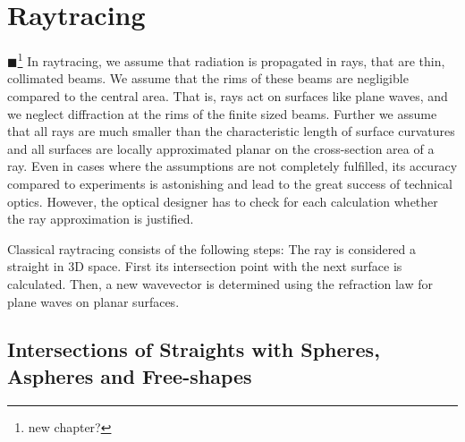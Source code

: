 \documentclass[12pt,a4paper,twoside,openright,BCOR10mm,headsepline,titlepage,abstracton,chapterprefix,final]{scrreprt}
\newcommand{\remark}[1]{{\color{red}$\blacksquare$}\footnote{{\color{red}#1}}}
\begin{document}
\chapter{Raytracing}
\remark{new chapter?}
In raytracing, we assume that radiation is propagated in rays, that are thin, collimated beams. 
We assume that the rims of these beams are negligible compared to the central area. That is, rays act on surfaces like plane waves, and we neglect diffraction at the rims of the finite sized beams.
Further we assume that all rays are much smaller than the characteristic length of surface curvatures and all surfaces are locally approximated planar on the cross-section area of a ray.
Even in cases where the assumptions are not completely fulfilled, its accuracy compared to experiments is astonishing and lead to the great success of technical optics.
However, the optical designer has to check for each calculation whether the ray approximation is justified.

Classical raytracing consists of the following steps: The ray is considered a straight in 3D space. First its intersection point with the next surface is calculated. 
Then, a new wavevector is determined using the refraction law for plane waves on planar surfaces.

\section{Intersections of Straights with Spheres, Aspheres and Free-shapes}\label{subsec:intersectionformulas}
\end{document}
